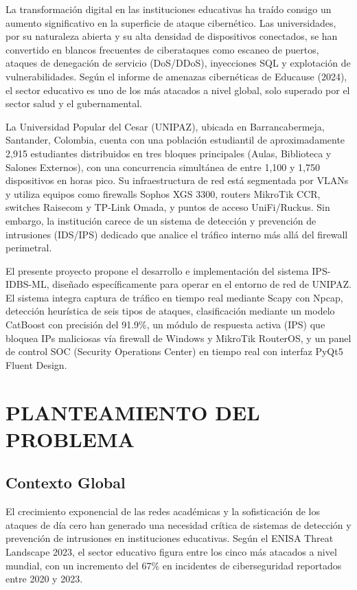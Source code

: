 \documentclass[12pt,letterpaper]{report}
\begin{document}
La transformación digital en las instituciones educativas ha traído consigo un aumento significativo en la superficie de ataque cibernético. Las universidades, por su naturaleza abierta y su alta densidad de dispositivos conectados, se han convertido en blancos frecuentes de ciberataques como escaneo de puertos, ataques de denegación de servicio (DoS/DDoS), inyecciones SQL y explotación de vulnerabilidades. Según el informe de amenazas cibernéticas de Educause (2024), el sector educativo es uno de los más atacados a nivel global, solo superado por el sector salud y el gubernamental.

La Universidad Popular del Cesar (UNIPAZ), ubicada en Barrancabermeja, Santander, Colombia, cuenta con una población estudiantil de aproximadamente 2,915 estudiantes distribuidos en tres bloques principales (Aulas, Biblioteca y Salones Externos), con una concurrencia simultánea de entre 1,100 y 1,750 dispositivos en horas pico. Su infraestructura de red está segmentada por VLANs y utiliza equipos como firewalls Sophos XGS 3300, routers MikroTik CCR, switches Raisecom y TP-Link Omada, y puntos de acceso UniFi/Ruckus. Sin embargo, la institución carece de un sistema de detección y prevención de intrusiones (IDS/IPS) dedicado que analice el tráfico interno más allá del firewall perimetral.

El presente proyecto propone el desarrollo e implementación del sistema IPS-IDBS-ML, diseñado específicamente para operar en el entorno de red de UNIPAZ. El sistema integra captura de tráfico en tiempo real mediante Scapy con Npcap, detección heurística de seis tipos de ataques, clasificación mediante un modelo CatBoost con precisión del 91.9\%, un módulo de respuesta activa (IPS) que bloquea IPs maliciosas vía firewall de Windows y MikroTik RouterOS, y un panel de control SOC (Security Operations Center) en tiempo real con interfaz PyQt5 Fluent Design.

\chapter{PLANTEAMIENTO DEL PROBLEMA}

\section{Contexto Global}

El crecimiento exponencial de las redes académicas y la sofisticación de los ataques de día cero han generado una necesidad crítica de sistemas de detección y prevención de intrusiones en instituciones educativas. Según el ENISA Threat Landscape 2023, el sector educativo figura entre los cinco más atacados a nivel mundial, con un incremento del 67\% en incidentes de ciberseguridad reportados entre 2020 y 2023.
\end{document}

